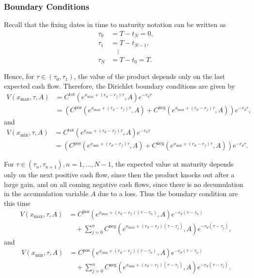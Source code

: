 \subsubsection{Boundary Conditions}
Recall that the fixing dates in time to maturity notation can be written as
\begin{align*}
\tau_0 &= T-t_N = 0,\\
\tau_1 &= T-t_{N-1},\\ 
&\quad\vdots\\ 
\tau_N &= T-t_0 = T.
\end{align*}

Hence, for $\tau \in (\tau_0,\tau_1)$, the value of the product depends only on the last expected cash flow. Therefore, the Dirichlet boundary conditions are given by
\begin{align*}
V(x_{\max},\tau,A) &= C^\text{tot}\left(e^{x_{\max}+(r_d-r_f)\tau},A\right)e^{-r_d\tau}\\
&= \left(C^\text{pos}\left(e^{x_{\max}+(r_d-r_f)\tau},A\right)+C^\text{neg}\left(e^{x_{\max}+(r_d-r_f)\tau},A\right)\right)e^{-r_d\tau},
\end{align*}
and
\begin{align*}
V(x_{\min},\tau,A) &= C^\text{tot}(e^{x_{\min}+(r_d-r_f)\tau},A)e^{-r_d\tau}\\
&= \left(C^\text{pos}\left(e^{x_{\min}+(r_d-r_f)\tau},A\right)+C^\text{neg}\left(e^{x_{\min}+(r_d-r_f)\tau},A\right)\right)e^{-r_d\tau}.
\end{align*}

For $\tau \in (\tau_n,\tau_{n+1}), n= 1,\ldots,N-1$, the expected value at maturity depends only on the next positive cash flow, since then the product knocks out after a large gain, and on all coming negative cash flows, since there is no decumulation in the accumulation variable $A$ due to a loss. Thus the boundary condition are this time
\begin{align*}
V(x_{\max},\tau,A) &= C^\text{pos}\left(e^{x_{\max}+(r_d-r_f)(\tau-\tau_n)},A\right)e^{-r_d(\tau-\tau_n)}\\
&\quad + \sum_{j = 0}^n C^\text{neg}\left(e^{x_{\max}+(r_d-r_f)(\tau-\tau_j)},A\right)e^{-r_d(\tau-\tau_j)},
\end{align*}
and
\begin{align*}
V(x_{\min},\tau,A) &= C^\text{pos}\left(e^{x_{\min}+(r_d-r_f)(\tau-\tau_n)},A\right)e^{-r_d(\tau-\tau_n)}\\
&\quad + \sum_{j = 0}^n C^\text{neg}\left(e^{x_{\min}+(r_d-r_f)(\tau-\tau_j)},A\right)e^{-r_d(\tau-\tau_j)}.
\end{align*}

